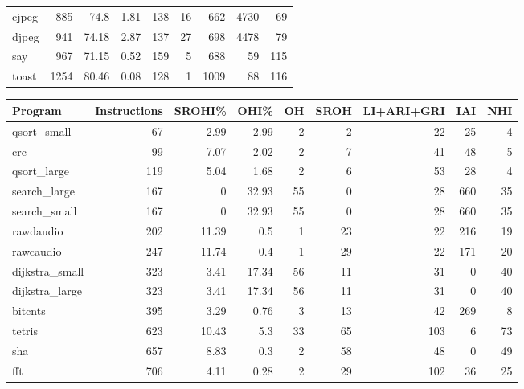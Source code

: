 \begin{tabular}{lrrrrrrrr}
 cjpeg          &      885 &    74.8  &   1.81 &  138 &   16 &    662 &  4730 &    69 \\
 djpeg          &      941 &    74.18 &   2.87 &  137 &   27 &    698 &  4478 &    79 \\
 say            &      967 &    71.15 &   0.52 &  159 &    5 &    688 &    59 &   115 \\
 toast          &     1254 &    80.46 &   0.08 &  128 &    1 &   1009 &    88 &   116 \\
\hline
\end{tabular}\begin{tabular}{lrrrrrrrr}
\hline
 Program        &   Instructions &   SROHI\% &   OHI\% &   OH &   SROH &   LI+ARI+GRI &   IAI &   NHI \\
\hline
 qsort\_small    &             67 &     2.99 &   2.99 &    2 &      2 &           22 &    25 &     4 \\
 crc            &             99 &     7.07 &   2.02 &    2 &      7 &           41 &    48 &     5 \\
 qsort\_large    &            119 &     5.04 &   1.68 &    2 &      6 &           53 &    28 &     4 \\
 search\_large   &            167 &     0    &  32.93 &   55 &      0 &           28 &   660 &    35 \\
 search\_small   &            167 &     0    &  32.93 &   55 &      0 &           28 &   660 &    35 \\
 rawdaudio      &            202 &    11.39 &   0.5  &    1 &     23 &           22 &   216 &    19 \\
 rawcaudio      &            247 &    11.74 &   0.4  &    1 &     29 &           22 &   171 &    20 \\
 dijkstra\_small &            323 &     3.41 &  17.34 &   56 &     11 &           31 &     0 &    40 \\
 dijkstra\_large &            323 &     3.41 &  17.34 &   56 &     11 &           31 &     0 &    40 \\
 bitcnts        &            395 &     3.29 &   0.76 &    3 &     13 &           42 &   269 &     8 \\
 tetris         &            623 &    10.43 &   5.3  &   33 &     65 &          103 &     6 &    73 \\
 sha            &            657 &     8.83 &   0.3  &    2 &     58 &           48 &     0 &    49 \\
 fft            &            706 &     4.11 &   0.28 &    2 &     29 &          102 &    36 &    25 \\

\end{tabular}
